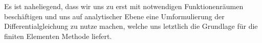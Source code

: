 Es ist naheliegend, dass wir uns zu erst mit notwendigen Funktionenräumen beschäftigen und uns auf analytischer Ebene eine Umformulierung der Differentialgleichung zu nutze machen, welche uns letztlich die Grundlage für die finiten Elementen Methode liefert.




